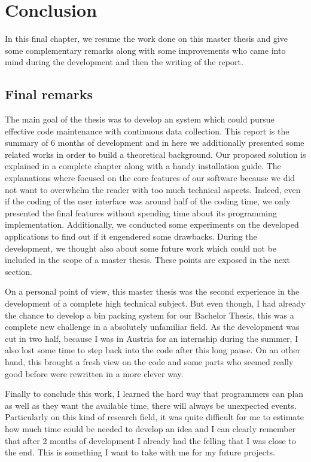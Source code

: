 \chapter{Conclusion} %
\label{chap:conclusion}

In this final chapter, we resume the work done on this master thesis and give some complementary remarks along with some improvements who came into mind during the development and then the writing of the report.

\section{Final remarks}
The main goal of the thesis was to develop an system which could pursue effective code maintenance with continuous data collection. This report is the summary of 6 months of development and in here we additionally presented some related works in order to build a theoretical background. Our proposed solution is explained in a complete chapter along with a handy installation guide. The explanations where focused on the core features of our software because we did not want to overwhelm the reader with too much technical aspects. Indeed, even if the coding of the user interface was around half of the coding time, we only presented the final features without spending time about its programming implementation.  Additionally, we conducted some experiments on the developed applications to find out if it engendered some drawbacks. During the development, we thought also about some future work which could not be included in the scope of a master thesis. These points are exposed in the next section.

On a personal point of view, this master thesis was the second experience in the development of a complete high technical subject. But even though, I had already the chance to develop a bin packing system for our Bachelor Thesis, this was a complete new challenge in a absolutely unfamiliar field. As the development was cut in two half, because I was in Austria for an internship during the summer, I also lost some time to step back into the code after this long pause. On an other hand, this brought a fresh view on the code and some parts who seemed really good before were rewritten in a more clever way.

Finally to conclude this work, I learned the hard way that programmers can plan as well as they want the available time, there will always be unexpected events. Particularly on this kind of research field, it was quite difficult for me to estimate how much time could be needed to develop an idea and I can clearly remember that after 2 months of development I already had the felling that I was close to the end. This is something I want to take with me for my future projects.

